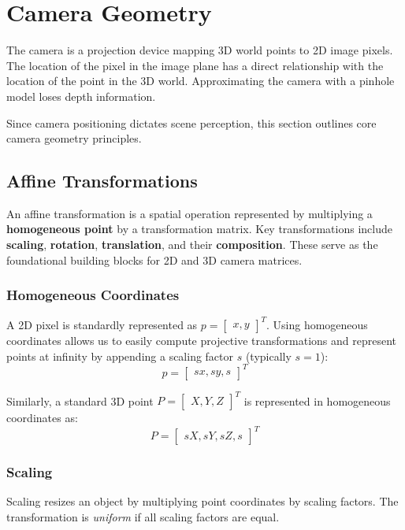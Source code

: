 \section{Camera Geometry}
The camera is a projection device mapping 3D world points to 2D image pixels. The location of the pixel in the image plane has a direct relationship with the location of the point in the 3D world.
Approximating the camera with a pinhole model loses depth information. 

Since camera positioning dictates scene perception, this section outlines core camera geometry principles.

\subsection{Affine Transformations}
An affine transformation is a spatial operation represented by multiplying a \textbf{homogeneous point} by a transformation matrix. 
Key transformations include \textbf{scaling}, \textbf{rotation}, \textbf{translation}, and their \textbf{composition}. 
These serve as the foundational building blocks for 2D and 3D camera matrices.

\subsubsection{Homogeneous Coordinates}
A 2D pixel is standardly represented as $p = \begin{bmatrix} x, y \end{bmatrix}^T$. 
Using homogeneous coordinates allows us to easily compute projective transformations and represent points at infinity by appending a scaling factor $s$ (typically $s=1$):
\[ p = \begin{bmatrix} sx, sy, s \end{bmatrix}^T \]

Similarly, a standard 3D point $P = \begin{bmatrix} X, Y, Z \end{bmatrix}^T$ is represented in homogeneous coordinates as:
\[ P = \begin{bmatrix} sX, sY, sZ, s \end{bmatrix}^T \]

\subsubsection{Scaling}
Scaling resizes an object by multiplying point coordinates by scaling factors. 
The transformation is \emph{uniform} if all scaling factors are equal.

